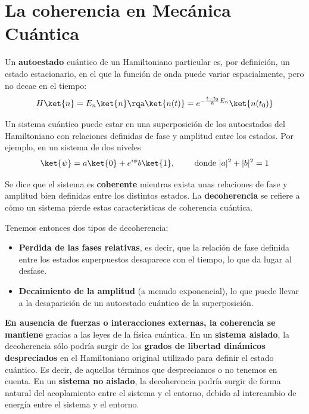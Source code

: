 \section{La coherencia en Mecánica Cuántica}

    Un \textbf{autoestado} cuántico de un Hamiltoniano particular es, por definición, un estado estacionario, en el que la función de onda puede variar espacialmente, pero no decae en el tiempo:
    \begin{equation}
        H \ket{n} = E_n \ket{n} \rqa \ket{n(t)} = e^{- \frac{t-t_0}{\hbar}E_n} \ket{n(t_0)} 
    \end{equation}
    
    Un sistema cuántico puede estar en una superposición de los autoestados del Hamiltoniano con relaciones definidas de fase y amplitud entre los estados. Por ejemplo, en un sistema de dos niveles
    \begin{equation}
    \ket{\psi} = a \ket{0}  + e^{i \phi} b \ket{1}, \qquad \text{ donde } |a|^2 + |b|^2 = 1
    \end{equation}
    
    \begin{mybox_gray2}{}
        Se dice que el sistema es \textbf{coherente} mientras exista unas relaciones de fase y amplitud bien definidas entre los distintos estados. La \textbf{decoherencia} se refiere a cómo un sistema pierde estas características de coherencia cuántica. 
    \end{mybox_gray2}
    
    Tenemos entonces dos tipos de decoherencia:
    \begin{itemize}
        \item \textbf{Perdida de las fases relativas}, es decir, que la relación de fase definida entre los estados superpuestos desaparece con el tiempo, lo que da lugar al desfase.
        \item \textbf{Decaimiento de la amplitud} (a menudo exponencial), lo que puede llevar a la desaparición de un autoestado cuántico de la superposición.
    \end{itemize}
    
    \textbf{En ausencia de fuerzas o interacciones externas, la coherencia se mantiene} gracias a las leyes de la física cuántica. En un \textbf{sistema aislado}, la decoherencia sólo podría surgir de los \textbf{grados de libertad dinámicos despreciados} en el Hamiltoniano original utilizado para definir el estado cuántico. Es decir, de aquellos términos que despreciamos o no tenemos en cuenta. En un \textbf{sistema no aislado}, la decoherencia podría surgir de forma natural del acoplamiento entre el sistema y el entorno, debido al intercambio de energía entre el sistema y el entorno. 
    
